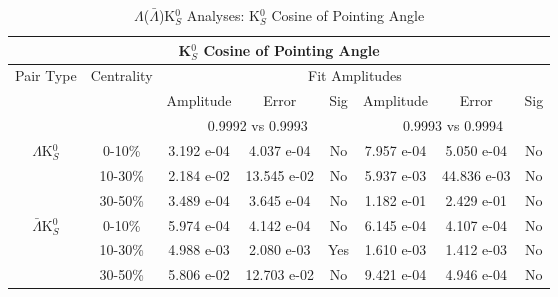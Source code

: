 \documentclass[../AnalysisNoteJBuxton.tex]{subfiles}
\begin{document}
\begin{table}
 \centering
 \begin{tabular}{|c|c|c|c|c||c|c|c|}
  \multicolumn{8}{c}{K$^{0}_{S}$ Cosine of Pointing Angle} \\
  \hline
  \multirow{3}{*}{Pair Type} & \multirow{3}{*}{Centrality} & \multicolumn{6}{c|}{Fit Amplitudes} \\
  \cline{3-8}
   & & Amplitude & Error & Sig & Amplitude & Error & Sig \\  
  \cline{3-8}
   & & \multicolumn{3}{c||}{0.9992 vs 0.9993} & \multicolumn{3}{c|}{0.9993 vs 0.9994} \\  
  \hline  
  \multirow{3}{*}{$\Lambda$K$^{0}_{S}$}  
   &  0-10\% & 3.192 e-04 & 4.037 e-04 & No & 7.957 e-04 & 5.050 e-04 & No \\
   & 10-30\% & 2.184 e-02 & 13.545 e-02 & No & 5.937 e-03 & 44.836 e-03 & No \\
   & 30-50\% & 3.489 e-04 & 3.645 e-04 & No & 1.182 e-01 & 2.429 e-01 & No \\
  \hline  
  \multirow{3}{*}{$\bar{\Lambda}$K$^{0}_{S}$}  
   &  0-10\% & 5.974 e-04 & 4.142 e-04 & No & 6.145 e-04 & 4.107 e-04 & No \\
   & 10-30\% & 4.988 e-03 & 2.080 e-03 & Yes & 1.610 e-03 & 1.412 e-03 & No \\
   & 30-50\% & 5.806 e-02 & 12.703 e-02 & No & 9.421 e-04 & 4.946 e-04 & No \\
  \hline
 \end{tabular}
 \caption{$\Lambda$($\bar{\Lambda}$)K$^{0}_{S}$ Analyses: K$^{0}_{S}$ Cosine of Pointing Angle}
 \label{tab:K0CosPointingAngleLamK0}
\end{table}
\end{document}
